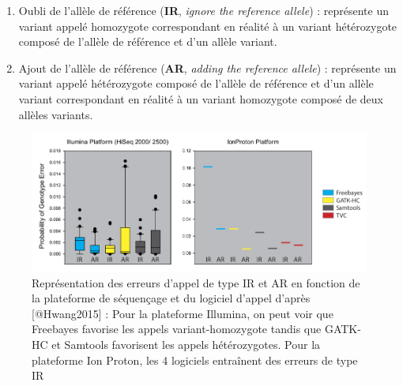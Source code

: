 \documentclass[12pt,twoside]{reedthesis}
\providecommand{\tightlist}{%
  \setlength{\itemsep}{0pt}\setlength{\parskip}{0pt}}
\theoremstyle{definition}
\theoremstyle{definition}
\theoremstyle{remark}
\begin{document}
  \begin{enumerate}
  \def\labelenumi{\arabic{enumi}.}
  \tightlist
  \item
    Oubli de l'allèle de référence (\textbf{IR}, \emph{ignore the
    reference allele}) : représente un variant appelé homozygote
    correspondant en réalité à un variant hétérozygote composé de l'allèle
    de référence et d'un allèle variant.\\
  \item
    Ajout de l'allèle de référence (\textbf{AR}, \emph{adding the
    reference allele}) : représente un variant appelé hétérozygote composé
    de l'allèle de référence et d'un allèle variant correspondant en
    réalité à un variant homozygote composé de deux allèles variants.\\
  \end{enumerate}
  
  \begin{figure}
  
  {\centering \includegraphics[scale=.50]{figure/snp_error_type} 
  
  }
  
  \caption[Représentation des erreurs d'appel de type IR et AR en fonction de la plateforme de séquençage et du logiciel d'appel]{Représentation des erreurs d'appel de type IR et AR en fonction de la plateforme de séquençage et du logiciel d'appel d'après [@Hwang2015] : Pour la plateforme Illumina, on peut voir que Freebayes favorise les appels variant-homozygote tandis que GATK-HC et Samtools favorisent les appels hétérozygotes. Pour la plateforme Ion Proton, les 4 logiciels entraînent des erreurs de type IR}\label{fig:snperror}
  \end{figure}
  
\end{document}
